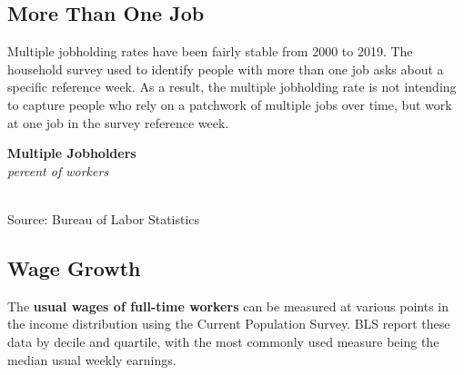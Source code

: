 \documentclass{report}
\makeatletter
\newcommand{\tbllink}[1]{\href{https://raw.githubusercontent.com/bdecon/US-chartbook/master/chartbook/data/#1}{\faTable}}
\newcommand*\short[1]{\expandafter\@gobbletwo\number\numexpr#1\relax}
\newcommand{\shdateaxisticks}{
		date coordinates in=x, axis line style={draw=none},
		xmax={2021-05-15},
		max space between ticks=40,	    
		xtick={{1990-01-01}, {1995-01-01}, {2000-01-01}, 
			{2005-01-01}, {2010-01-01}, {2015-01-01}, {2020-01-01}},
		minor xtick={},
		enlarge y limits={0.06}, enlarge x limits={0.01},
		}
\newcommand{\thinline}[4]{\addplot[no markers, color=#1] 
		table [x=#2, y=#3, col sep=comma] {#4};	}
\newcommand{\rebars}{
		\fill[color=black!10] (axis cs:{2007-12-01},\pgfkeysvalueof{/pgfplots/ymin}) rectangle 
			(axis cs:{2009-07-01}, \pgfkeysvalueof{/pgfplots/ymax});
		\fill[color=black!10] (axis cs:{2001-03-01},\pgfkeysvalueof{/pgfplots/ymin}) rectangle 
			(axis cs:{2001-11-01}, \pgfkeysvalueof{/pgfplots/ymax});
		\fill[color=black!10] (axis cs:{2020-02-01},\pgfkeysvalueof{/pgfplots/ymin}) rectangle 
			(axis cs:{2021-05-15}, \pgfkeysvalueof{/pgfplots/ymax});}
\makeatother
\begin{document}
{{\begin{minipage}{0.76\textwidth}
\subsection*{\color{black!70} \seriffont More Than One Job}
\small Multiple jobholding rates have been fairly stable from 2000 to 2019. The household survey used to identify people with more than one job asks about a specific reference week. As a result, the multiple jobholding rate is not intending to capture people who rely on a patchwork of multiple jobs over time, but work at one job in the survey reference week. 
\end{minipage}

\begin{minipage}{0.43\textwidth}
\normalsize \textbf{Multiple Jobholders}\\
\footnotesize{\textit{percent of workers}}\\
\hspace*{-2mm} \\
\footnotesize{Source: Bureau of Labor Statistics} \hfill \tbllink{mjh.csv} 
\end{minipage}
\hspace{7mm}
\begin{minipage}{0.28\textwidth}
\small 
\end{minipage}
\newpage
\begin{minipage}{0.76\textwidth}
\subsection*{\color{black!70} \seriffont Wage Growth}
\small The \textbf{usual wages of full-time workers} can be measured at various points in the income distribution using the Current Population Survey. BLS report these data by decile and quartile, with the most commonly used measure being the median usual weekly earnings.


\vspace{3mm}


\end{minipage}}}
\end{document}
